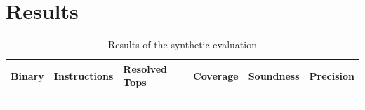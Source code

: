 \documentclass{kththesis}
\begin{document}

\chapter{Results}\label{chap:results}


\begin{table}[ht]
\centering
\begin{tabular}{|l|l|l|l|l|l|}
\hline
\textbf{Binary} & \textbf{Instructions} & \textbf{Resolved Tops} & \textbf{Coverage} & \textbf{Soundness} & \textbf{Precision} \\ \hline
                &                       &                        &                   &                    &                    \\ \hline
                &                       &                        &                   &                    &                    \\ \hline
                &                       &                        &                   &                    &                    \\ \hline
\end{tabular}
\caption[]{Results of the synthetic evaluation}
\label{tab:jumps}
\end{table}
\end{document}
